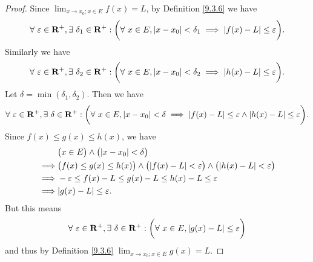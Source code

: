 \begin{proof}
    Since \(\lim_{x \to x_0 ; x \in E} f(x) = L\), by Definition \ref{9.3.6} we have
    \[
        \forall\ \varepsilon \in \mathbf{R}^+, \exists\ \delta_1 \in \mathbf{R}^+ : \bigg(\forall\ x \in E, \abs*{x - x_0} < \delta_1 \implies \abs*{f(x) - L} \leq \varepsilon\bigg).
    \]
    Similarly we have
    \[
        \forall\ \varepsilon \in \mathbf{R}^+, \exists\ \delta_2 \in \mathbf{R}^+ : \bigg(\forall\ x \in E, \abs*{x - x_0} < \delta_2 \implies \abs*{h(x) - L} \leq \varepsilon\bigg).
    \]
    Let \(\delta = \min(\delta_1, \delta_2)\).
    Then we have
    \[
        \forall\ \varepsilon \in \mathbf{R}^+, \exists\ \delta \in \mathbf{R}^+ : \bigg(\forall\ x \in E, \abs*{x - x_0} < \delta \implies \abs*{f(x) - L} \leq \varepsilon \land \abs*{h(x) - L} \leq \varepsilon\bigg).
    \]
    Since \(f(x) \leq g(x) \leq h(x)\), we have
    \begin{align*}
                 & \big(x \in E\big) \land \big(\abs*{x - x_0} < \delta\big)                                                                      \\
        \implies & \big(f(x) \leq g(x) \leq h(x)\big) \land \big(\abs*{f(x) - L} < \varepsilon\big) \land \big(\abs*{h(x) - L} < \varepsilon\big) \\
        \implies & -\varepsilon \leq f(x) - L \leq g(x) - L \leq h(x) - L \leq \varepsilon                                                        \\
        \implies & \abs*{g(x) - L} \leq \varepsilon.
    \end{align*}
    But this means
    \[
        \forall\ \varepsilon \in \mathbf{R}^+, \exists\ \delta \in \mathbf{R}^+ : \bigg(\forall\ x \in E, \abs*{g(x) - L} \leq \varepsilon\bigg)
    \]
    and thus by Definition \ref{9.3.6} \(\lim_{x \to x_0 ; x \in E} g(x) = L\).
\end{proof}